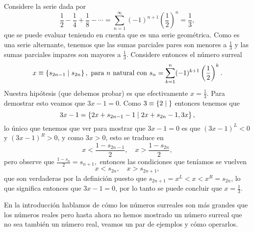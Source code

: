    \begin{example}[El inverso de 3]
        \label{inverse_3}
        Considere la serie dada por
        \[
            \frac{1}{2}-\frac{1}{4}+\frac{1}{8}-\cdots = \sum_{n=1}^{\infty} (-1)^{n+1}\left(\frac{1}{2}\right)^n = \frac{1}{3},
        \]
        que se puede evaluar teniendo en cuenta que es una serie geom\'etrica. Como es una serie alternante, tenemos que las sumas parciales pares son menores a $\frac{1}{3}$ y las sumas parciales impares son mayores a $\frac{1}{3}$. Considere entonces el n\'umero surreal
        \[
            x\equiv \left\{s_{2n-1}\;\middle|\; s_{2n}\right\},\text{ para $n$ natural con } s_n = \sum_{k=1}^{n} (-1)^{k+1}\left(\frac{1}{2}\right)^k.
        \]
        Nuestra hip\'otesis (que debemos probar) es que efectivamente $x = \frac{1}{3}$. Para demostrar esto veamos que $3x-1 = 0$. Como $3\equiv \left\{2\;\middle|\; \right\}$ entonces tenemos que 
        \[
            3x-1 = \left\{2x+s_{2n-1}-1\;\middle|\; 2x+s_{2n}-1, 3x\right\},
        \]
        lo \'unico que tenemos que ver para mostrar que $3x-1 = 0$ es que $(3x-1)^L < 0$ y $(3x-1)^R > 0$, y como $3x > 0$, esto se traduce en 
        \[
            x < \frac{1-s_{2n-1}}{2},\quad x > \frac{1-s_{2n}}{2}, 
        \]
        pero observe que $\frac{1-s_{n}}{2} = s_{n+1},$ entonces las condiciones que ten\'iamos se vuelven
        \[
            x < s_{2n},\quad x > s_{2n+1},
        \]
        que son verdaderas por la definici\'on puesto que $s_{2n+1} = x^L < x < x^R = s_{2n}$, lo que significa entonces que $3x-1 = 0$, por lo tanto se puede concluir que $x = \frac{1}{3}$.
    \end{example}

    En la introducci\'on hablamos de c\'omo los n\'umeros surreales son m\'as grandes que los n\'umeros reales pero hasta ahora no hemos mostrado un n\'umero surreal que no sea tambi\'en un n\'umero real, veamos un par de ejemplos y c\'omo operarlos.

